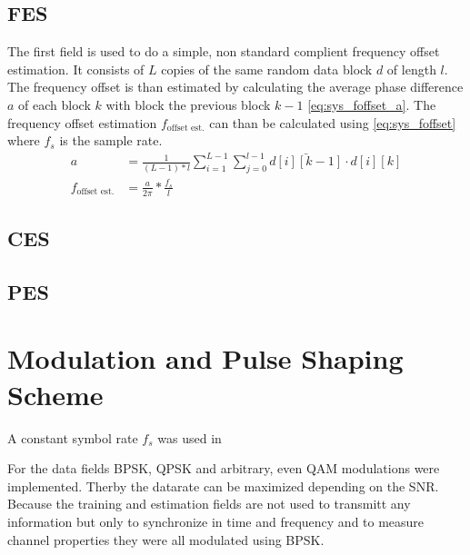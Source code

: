 \subsection{\acrfull{FES}}
The first field is used to do a simple, non standard complient frequency offset
estimation. It consists of $L$ copies of the same random data block $d$
of length $l$.
The frequency offset is than estimated by calculating the average phase
difference $a$ of each block $k$ with block the previous block $k - 1$
\eqref{eq:sys_foffset_a}. The frequency offset estimation $f_{\text{offset est.}}$
can than be calculated using \eqref{eq:sys_foffset}
where $f_s$ is the sample rate. \\

\begin{subequations}
  \begin{alignat}{2}
    a &= \frac{1}{(L-1) * l}
    \sum_{i=1}^{L-1} \sum_{j=0}^{l-1} \bar{d[i][k-1]} \cdot d[i][k]
    \label{eq:sys_foffset_a} \\
    f_{\text{offset est.}} &= \frac{a}{2 \pi} * \frac{f_s}{l}
    \label{eq:sys_foffset}
  \end{alignat}
\end{subequations}

\subsection{\acrfull{CES}}



\subsection{\acrfull{PES}}

\section{Modulation and Pulse Shaping Scheme}
A constant symbol rate $f_s$ was used in

For the data fields \gls{BPSK}, \gls{QPSK} and arbitrary, even
\gls{QAM} modulations were implemented. Therby the datarate
can be maximized depending on the \gls{SNR}. \\

Because the training and estimation fields are not used to
transmitt any information but only to synchronize in time
and frequency and to measure channel properties they were all
modulated using \gls{BPSK}. \\

